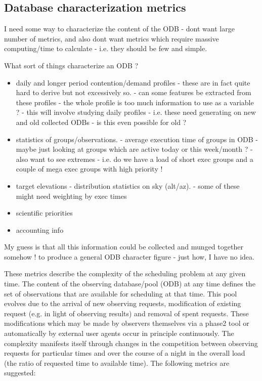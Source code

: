 \subsection{Database characterization metrics}

I need some way to characterize the content of the ODB - dont want large number of metrics, 
and also dont want metrics which require massive computing/time to calculate 
- i.e. they should be few and simple.

What sort of things characterize an ODB ?

\begin{itemize}
\item daily and longer period contention/demand profiles 
- these are in fact quite hard to derive but not excessively so.
- can some features be extracted from these profiles 
 - the whole profile is too much information to use as a variable ?
 - this will involve studying daily profiles 
 - i.e. these need generating on new and old collected ODBs 
 - is this even possible for old ?

\item statistics of groups/observations.
- average execution time of groups in ODB 
 - maybe just looking at groups which are active today or this week/month ?
 - also want to see extremes - i.e. do we have a load of short exec groups
 and a couple of mega exec groups with high priority !
 
\item target elevations - distribution statistics on sky (alt/az).
- some of these might need weighting by exec times

\item scientific priorities

\item accounting info

\end{itemize}

My guess is that all this information could be collected and munged together somehow !
to produce a general ODB character figure - just how, I have no idea.


These metrics describe the complexity of the scheduling problem at any given time. The content of the observing database/pool (ODB) at any time defines the set of observations that are available for scheduling at that time. This pool evolves due to the arrival of new observing requests, modification of existing request (e.g. in light of observing results) and removal of spent requests. These modifications which may be made by observers themselves via a phase2 tool or automatically by external user agents occur in principle continuously. The complexity manifests itself through changes in the competition between observing requests for particular times and over the course of a night in the overall load (the ratio of requested time to available time). The following metrics are suggested:


